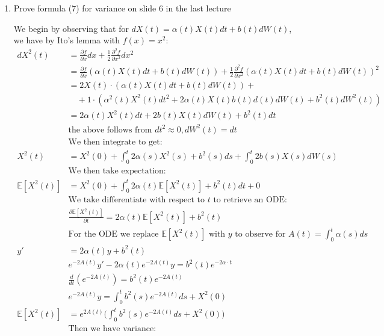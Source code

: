 \documentclass[12pt,twoside, letter]{exam}
\theoremstyle{definition}
\newcommand{\ee}{\mathbb{E}}
\begin{document}
\begin{enumerate}
  \item Prove formula (7) for variance on slide 6 in the last lecture
    \begin{solution}
      We begin by observing that for $dX(t) = \alpha(t)X(t) dt + b(t)dW(t)$, we have by Ito's lemma with $f(x) = x^2$:
      \begin{align*}
        dX^2(t) &= \frac{\partial f}{\partial x}dx + \frac{1}{2}\frac{\partial^2 f}{\partial x^2}dx^2 \\
        &= \frac{\partial f}{\partial x}(\alpha(t)X(t) dt + b(t)dW(t)) + \frac{1}{2}\frac{\partial^2 f}{\partial x^2}
        (\alpha(t)X(t) dt + b(t)dW(t))^2 \\
        &= 2X(t)\cdot(\alpha(t)X(t) dt + b(t)dW(t)) + \\
        & \quad + 1\cdot(\alpha^2(t)X^2(t)dt^2 + 2\alpha(t)X(t)b(t)d(t)dW(t) + b^2(t)dW^2(t)) \\
        &= 2\alpha(t)X^2(t)dt + 2b(t)X(t)dW(t) + b^2(t)dt \\
        &\text{the above follows from $dt^2 \approx 0, dW^2(t) = dt$}\\
        &\text{We then integrate to get:} \\
        X^2(t) &= X^2(0) + \int^t_0 2\alpha(s)X^2(s) + b^2(s)ds + \int^t_0 2b(s)X(s)dW(s) \\
        &\text{We then take expectation:} \\
        \ee[X^2(t)] &= X^2(0) + \int^t_0 2\alpha(t)\ee[X^2(t)] + b^2(t) dt + 0 \\
        &\text{We take differentiate with respect to $t$ to retrieve an ODE:} \\
        &\frac{\partial \ee[X^2(t)]}{\partial t} = 2\alpha(t)\ee[X^2(t)] + b^2(t) \\
        &\text{For the ODE we replace $\ee[X^2(t)]$ with $y$ to observe for $A(t) = \int^t_0 \alpha(s) ds$} \\
        y' &= 2\alpha(t) y + b^2(t) \\
        &e^{-2A(t)}y' - 2\alpha(t) e^{-2 A(t)} y = b^2(t) e^{-2 \alpha \cdot t} \\
        &\frac{d}{dt}(e^{-2 A(t)}) = b^2(t) e^{-2 A(t)} \\
        &e^{-2 A(t)}y = \int^t_0 b^2(s) e^{-2 A(t)} ds + X^2(0)\\
        \ee[X^2(t)] &= e^{2 A(t)} \bigg(\int^t_0 b^2(s) e^{-2 A(t)} ds + X^2(0)\bigg) \\
        &\text{Then we have variance:} \\

\end{align*}
\end{solution}
\end{enumerate}
\end{document}
